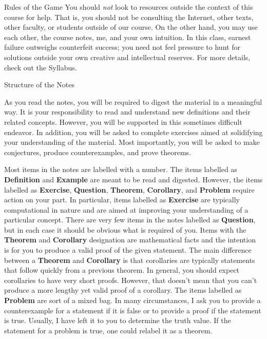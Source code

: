 \begin{section}{Rules of the Game}
You should \emph{not} look to resources outside the context of this course for help. That is, you should not be consulting the Internet, other texts, other faculty, or students outside of our course. On the other hand, you may use each other, the course notes, me, and your own intuition.  In this class, earnest failure outweighs counterfeit success; you need not feel pressure to hunt for solutions outside your own creative and intellectual reserves.  For more details, check out the Syllabus.

\end{section}

\begin{section}{Structure of the Notes}

As you read the notes, you will be required to digest the material in a meaningful way.  It is your responsibility to read and understand new definitions and their related concepts.  However, you will be supported in this sometimes difficult endeavor. In addition, you will be asked to complete exercises aimed at solidifying your understanding of the material.  Most importantly, you will be asked to make conjectures, produce counterexamples, and prove theorems.

Most items in the notes are labelled with a number.  The items labelled as \textbf{Definition} and \textbf{Example} are meant to be read and digested.  However, the items labelled as \textbf{Exercise}, \textbf{Question}, \textbf{Theorem}, \textbf{Corollary}, and \textbf{Problem} require action on your part.  In particular, items labelled as \textbf{Exercise} are typically computational in nature and are aimed at improving your understanding of a particular concept.  There are very few items in the notes labelled as \textbf{Question}, but in each case it should be obvious what is required of you.  Items with the \textbf{Theorem} and \textbf{Corollary} designation are mathematical facts and the intention is for you to produce a valid proof of the given statement.  The main difference between a \textbf{Theorem} and \textbf{Corollary} is that corollaries are typically statements that follow quickly from a previous theorem.  In general, you should expect corollaries to have very short proofs.  However, that doesn't mean that you can't produce a more lengthy yet valid proof of a corollary.  The items labelled as \textbf{Problem} are sort of a mixed bag.  In many circumstances, I ask you to provide a counterexample for a statement if it is false or to provide a proof if the statement is true.  Usually, I have left it to you to determine the truth value.  If the statement for a problem is true, one could relabel it as a theorem.


\end{section}
